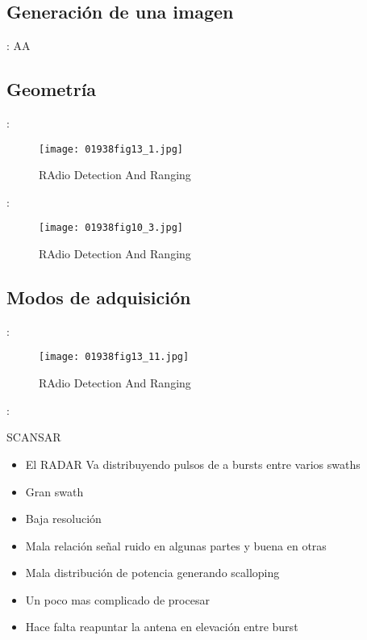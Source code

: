 \subsection{Generación de una imagen}
\begin{frame}{\secname : \subsecname}
    AA
\end{frame}

\subsection{Geometría}
\begin{frame}{\secname : \subsecname}
  \begin{figure}
    \centering
    \texttt{[image: 01938fig13\_1.jpg]}
    \caption{RAdio Detection And Ranging}
    \label{}
  \end{figure}
\end{frame}

\begin{frame}{\secname : \subsecname}
  \begin{figure}
    \centering
    \texttt{[image: 01938fig10\_3.jpg]}
    \caption{RAdio Detection And Ranging}
    \label{}
  \end{figure}
\end{frame}

\subsection{Modos de adquisición}
\begin{frame}{\secname : \subsecname}
  \begin{figure}
    \centering
    \texttt{[image: 01938fig13\_11.jpg]}
    \caption{RAdio Detection And Ranging}
    \label{}
  \end{figure}
\end{frame}

\begin{frame}{\secname : \subsecname}
    \begin{block}{SCANSAR}
      \begin{itemize}
        \item El RADAR Va distribuyendo pulsos de  a bursts entre varios swaths
        \item Gran swath
        \item Baja resolución
        \item Mala relación señal ruido en algunas partes y buena en otras
        \item Mala distribución de potencia generando scalloping
        \item Un poco mas complicado de procesar
        \item Hace falta reapuntar la antena en elevación entre burst
      \end{itemize}
    \end{block}
\end{frame}

